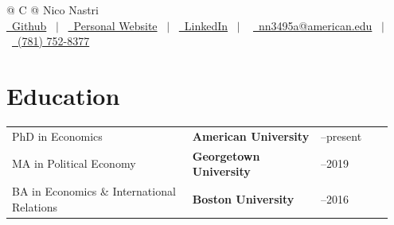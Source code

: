 \documentclass[a4paper,12pt]{article}
\begin{document}
\pagestyle{empty} 



\begin{tabularx}{\linewidth}{@{} C @{}}
\Huge{Nico Nastri} \\[7.5pt]
\href{https://github.com/ngnastri10}{\raisebox{-0.05\height}\faGithub\ Github} \ $|$ \
\href{https://niconastri.com}{\raisebox{-0.05\height}\faGlobe\ Personal Website} \ $|$ \
\href{https://www.linkedin.com/in/niconastri/}{\raisebox{-0.05\height}\faLinkedin\ LinkedIn} \ $|$ \ 
\href{mailto:nn3495a@american.edu}{\raisebox{-0.05\height}\faEnvelope \ nn3495a@american.edu} \ $|$ \ 
\href{tel:(781) 752-8377}{\raisebox{-0.05\height}\faPhone \ (781) 752-8377} \\
\end{tabularx}

\section{Education}
\begin{tabular}{@{}>{\raggedright\arraybackslash}p{0.45\linewidth}%
                >{\raggedright\arraybackslash}p{0.32\linewidth}%
                >{\raggedleft\arraybackslash}p{0.18\linewidth}@{}}
PhD in Economics & \textbf{American University}      & 2022--present \\
MA in Political Economy & \textbf{Georgetown University} & 2018--2019 \\
BA in Economics \& International Relations & \textbf{Boston University} & 2012--2016 \\
\end{tabular}
\end{document}
